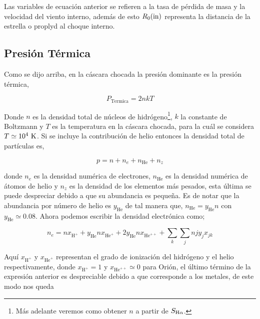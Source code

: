 Las variables de ecuación anterior se refieren a la tasa de pérdida de masa y la velocidad del viento interno, además de esto \(R_{0}(\mathrm{in}{})\) representa la distancia de la estrella o proplyd al choque interno.

\subsection{Presión Térmica}
\label{sec:pressur-thermal}

Como se dijo arriba, en la cáscara chocada la presión dominante es la presión térmica,

\begin{equation}
  \label{eq:presion-cascara}
  P_{\text{Termica}}=2 n k T 
\end{equation}
 
Donde \(n\) es la densidad total de núcleos de hidrógeno\footnote{Más adelante veremos como obtener \(n\) a partir de \(S_{\mathrm{H}\alpha{}}\). }, \(k\) la constante de Boltzmann y \(T\) es la temperatura en la cáscara chocada, para la cuál se considera \(T\simeq10^{4}~\mathrm{K}\). Si se incluye la contribución de helio entonces la densidad total de partículas es,

\begin{equation*}
  \label{eq:particulas}
  p = n + n_{e} + n_{\text{He}} + n_{z}
\end{equation*}

donde \(n_{e}\) es la densidad numérica de electrones, \(n_{\text{He}}\) es la densidad numérica de átomos de helio y \(n_{z}\) es la densidad de los elementos más pesados, esta última se puede despreciar debido a que su abundancia es pequeña. Es de notar que la abundancia por número de helio es \(y_{\text{He}}\) de tal manera que, \(n_{\text{He}} = y_{\text{He}} n\) con \(y_{\text{He}} \simeq 0.08\). Ahora podemos escribir la densidad electrónica como;

\begin{equation*}
  \label{eq:densidad-electronica}
  n_{e}=nx_{\text{H}^{+}} + y_{\text{He}}nx_{\text{He}^{+}} + 2 y_{\text{He}}nx_{\text{He}^{++}} + \sum_{k} \sum_{j}njy_{j}x_{jk}
\end{equation*}

Aquí \(x_{\text{H}^{+}}\) y \(x_{\text{He}^{+}}\) representan el grado de ionización del hidrógeno y el helio respectivamente, donde \(x_{\text{H}^{+}}=1\) y \(x_{\text{He}^{++}} \simeq 0\) para Orión, el último término de la expresión anterior es despreciable debido a que corresponde a los metales, de este modo nos queda

